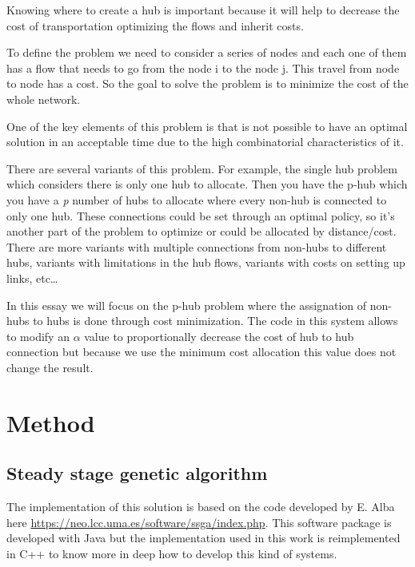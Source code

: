 \documentclass[12pt,oneside,a4paper]{article}
\begin{document}
    Knowing where to create a hub is important because it will help to decrease the cost of transportation optimizing
    the flows and inherit costs.

    To define the problem we need to consider a series of nodes and each one of them has a flow that needs to go from
    the node i to the node j.
    This travel from node to node has a cost.
    So the goal to solve the problem is to minimize the cost of the whole network.

    One of the key elements of this problem is that is not possible to have an optimal solution in an acceptable time
    due to the high combinatorial characteristics of it.

    There are several variants of this problem.
    For example, the single hub problem which considers there is only one hub to allocate.
    Then you have the p-hub which you have a \textit{p} number of hubs to allocate where every non-hub is connected
    to only one hub.
    These connections could be set through an optimal policy, so it's another part of the problem to optimize or could
    be allocated by distance/cost.
    There are more variants with multiple connections from non-hubs to different hubs, variants with limitations in
    the hub flows, variants with costs on setting up links, etc\ldots


    In this essay we will focus on the p-hub problem where the assignation of non-hubs to hubs is done through cost
    minimization.
    The code in this system allows to modify an \(\alpha\) value to proportionally decrease the cost of hub to hub
    connection but because we use the minimum cost allocation this value does not change the result.




    \section{Method}

    \subsection{Steady stage genetic algorithm}
    The implementation of this solution is based on the code developed by E. Alba here
    \url{https://neo.lcc.uma.es/software/ssga/index.php}.
    This software package is developed with Java but the implementation used in this work is reimplemented in C++ to
    know more in deep how to develop this kind of systems.
\end{document}
